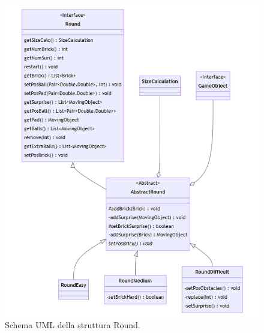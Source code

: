 \documentclass[a4paper,12pt]{report}
\begin{document}
\begin{figure}[H]
    \centering{}
    \includegraphics[scale=0.65]{images/Round.png}
    \caption{Schema UML della struttura Round.}
    \label{images:Round}
\end{figure}

\pagebreak
\end{document}
